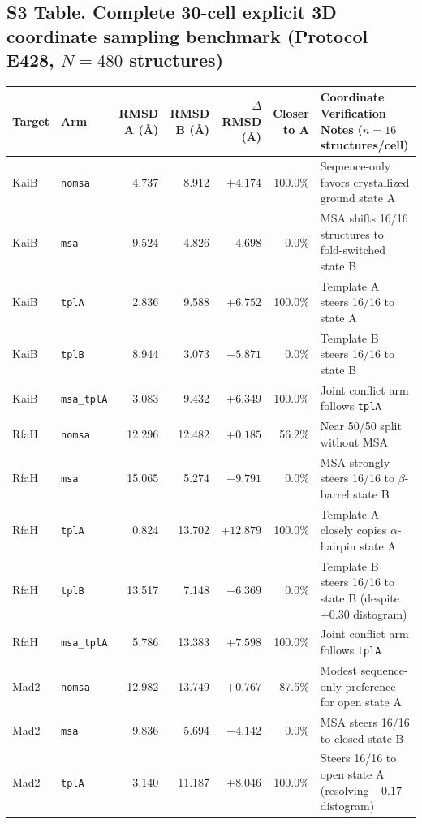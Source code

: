 \documentclass[10pt,a4paper]{article}
\renewcommand{\arraystretch}{1.12}
\begin{document}
\newpage
\subsection*{S3 Table. Complete 30-cell explicit 3D coordinate sampling benchmark (Protocol E428, $N=480$ structures)}
\begin{table}[!ht]
\centering
\scriptsize
\renewcommand{\arraystretch}{1.04}
\begin{tabularx}{\textwidth}{l l r r r r Y}
\toprule
\textbf{Target} & \textbf{Arm} & \textbf{RMSD A (\AA{})} & \textbf{RMSD B (\AA{})} & \textbf{$\Delta$RMSD (\AA{})} & \textbf{Closer to A} & \textbf{Coordinate Verification Notes ($n=16$ structures/cell)} \\
\midrule
KaiB & \texttt{nomsa} & 4.737 & 8.912 & $+4.174$ & 100.0\% & Sequence-only favors crystallized ground state A \\
KaiB & \texttt{msa} & 9.524 & 4.826 & $-4.698$ & 0.0\% & MSA shifts 16/16 structures to fold-switched state B \\
KaiB & \texttt{tplA} & 2.836 & 9.588 & $+6.752$ & 100.0\% & Template A steers 16/16 to state A \\
KaiB & \texttt{tplB} & 8.944 & 3.073 & $-5.871$ & 0.0\% & Template B steers 16/16 to state B \\
KaiB & \texttt{msa\_tplA} & 3.083 & 9.432 & $+6.349$ & 100.0\% & Joint conflict arm follows \texttt{tplA} \\
\midrule
RfaH & \texttt{nomsa} & 12.296 & 12.482 & $+0.185$ & 56.2\% & Near 50/50 split without MSA \\
RfaH & \texttt{msa} & 15.065 & 5.274 & $-9.791$ & 0.0\% & MSA strongly steers 16/16 to $\beta$-barrel state B \\
RfaH & \texttt{tplA} & 0.824 & 13.702 & $+12.879$ & 100.0\% & Template A closely copies $\alpha$-hairpin state A \\
RfaH & \texttt{tplB} & 13.517 & 7.148 & $-6.369$ & 0.0\% & Template B steers 16/16 to state B (despite $+0.30$ distogram) \\
RfaH & \texttt{msa\_tplA} & 5.786 & 13.383 & $+7.598$ & 100.0\% & Joint conflict arm follows \texttt{tplA} \\
\midrule
Mad2 & \texttt{nomsa} & 12.982 & 13.749 & $+0.767$ & 87.5\% & Modest sequence-only preference for open state A \\
Mad2 & \texttt{msa} & 9.836 & 5.694 & $-4.142$ & 0.0\% & MSA steers 16/16 to closed state B \\
Mad2 & \texttt{tplA} & 3.140 & 11.187 & $+8.046$ & 100.0\% & Steers 16/16 to open state A (resolving $-0.17$ distogram) \\

\end{tabularx}
\end{table}
\end{document}
